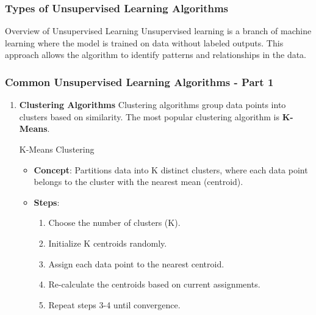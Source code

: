 \documentclass{beamer}
\begin{document}
\begin{frame}[fragile]
    \frametitle{Types of Unsupervised Learning Algorithms}
    \begin{block}{Overview of Unsupervised Learning}
        Unsupervised learning is a branch of machine learning where the model is trained on data without labeled outputs. This approach allows the algorithm to identify patterns and relationships in the data.
    \end{block}
\end{frame}

\begin{frame}[fragile]
    \frametitle{Common Unsupervised Learning Algorithms - Part 1}
    \begin{enumerate}
        \item \textbf{Clustering Algorithms}  
        Clustering algorithms group data points into clusters based on similarity. The most popular clustering algorithm is \textbf{K-Means}.
        
        \begin{block}{K-Means Clustering}
            \begin{itemize}
                \item \textbf{Concept}: Partitions data into K distinct clusters, where each data point belongs to the cluster with the nearest mean (centroid).
                \item \textbf{Steps}:
                \begin{enumerate}
                    \item Choose the number of clusters (K).
                    \item Initialize K centroids randomly.
                    \item Assign each data point to the nearest centroid.
                    \item Re-calculate the centroids based on current assignments.
                    \item Repeat steps 3-4 until convergence.
                \end{enumerate}
            \end{itemize}
        \end{block}
    \end{enumerate}
\end{frame}
\end{document}
